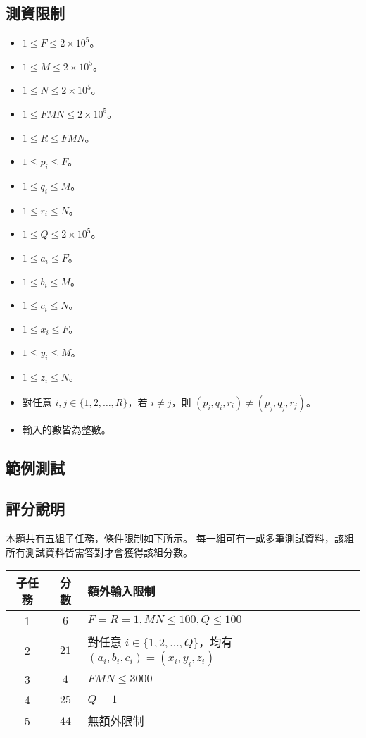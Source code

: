 \subsection{測資限制}

\begin{itemize}
\tightlist
\item
  \(1 \le F \le 2\times10^5\)。
\item
  \(1 \le M \le 2\times10^5\)。
\item
  \(1 \le N \le 2\times10^5\)。
\item
  \(1 \le FMN \le 2\times10^5\)。
\item
  \(1 \le R \le FMN\)。
\item
  \(1 \le p_i \le F\)。
\item
  \(1 \le q_i \le M\)。
\item
  \(1 \le r_i \le N\)。
\item
  \(1 \le Q \le 2\times10^5\)。
\item
  \(1 \le a_i \le F\)。
\item
  \(1 \le b_i \le M\)。
\item
  \(1 \le c_i \le N\)。
\item
  \(1 \le x_i \le F\)。
\item
  \(1 \le y_i \le M\)。
\item
  \(1 \le z_i \le N\)。
\item
  對任意 \(i, j \in \{1, 2, \ldots, R\}\)，若 \(i \ne j\)，則
  \((p_i, q_i, r_i) \ne (p_j, q_j, r_j)\)。
\item
  輸入的數皆為整數。
\end{itemize}

\subsection{範例測試}

\begin{example}
%
%
\end{example}

\subsection{評分說明}

本題共有五組子任務，條件限制如下所示。
每一組可有一或多筆測試資料，該組所有測試資料皆需答對才會獲得該組分數。

\begin{longtable}[]{@{}ccl@{}}
\toprule
子任務 & 分數 & 額外輸入限制 \\
\midrule
\endhead
1 & \(6\) & \(F = R = 1, MN \le 100, Q \le 100\) \\
2 & \(21\) & 對任意 \(i \in \{1, 2, \ldots, Q\}\)，均有
\((a_i, b_i, c_i) = (x_i, y_i, z_i)\) \\
3 & \(4\) & \(FMN \le 3000\) \\
4 & \(25\) & \(Q = 1\) \\
5 & \(44\) & 無額外限制 \\
\bottomrule
\end{longtable}

